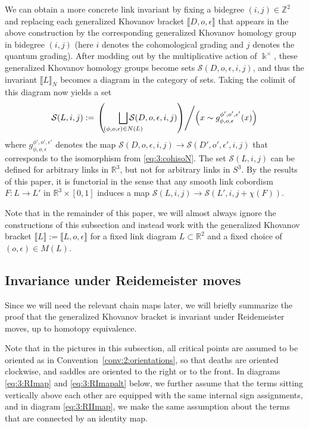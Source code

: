 \documentclass[12pt]{amsart}
\theoremstyle{definition}
\theoremstyle{plain}
\begin{document}
We can obtain a more concrete link invariant
by fixing a bidegree $(i,j)\in\mathbb{Z}^2$ and replacing 
each generalized Khovanov bracket $\llbracket D,o,\epsilon\rrbracket$ that appears in the above construction by 
the corresponding generalized Khovanov homology group in bidegree $(i,j)$ (here $i$ denotes the cohomological
grading and $j$ denotes the quantum grading).
After modding out by the multiplicative action of $\Bbbk^\times$, these generalized Khovanov homology groups
become sets $\mathcal{S}(D,o,\epsilon,i,j)$, 
and thus the invariant $\llbracket L\rrbracket_N$ becomes a diagram in the category of sets.
Taking the colimit of this diagram now yields a set
\[\mathcal{S}(L,i,j):=\left.\left(\quad\,\,\,\,\bigsqcup_{\mathclap{(\phi,o,\epsilon)\in N(L)}} \mathcal{S}(D,o,\epsilon,i,j)\right)\middle /
\left(x\sim g_{\phi,o,\epsilon}^{\phi',o',\epsilon'}(x)\right)\right.\]
where $g_{\phi,o,\epsilon}^{\phi',o',\epsilon'}$ denotes the map $\mathcal{S}(D,o,\epsilon,i,j)\rightarrow \mathcal{S}(D',o',\epsilon',i,j)$ that corresponds to the isomorphism from \eqref{eq:3:cohisoN}.
The set $\mathcal{S}(L,i,j)$ can be defined for arbitrary links in $\mathbb{R}^3$, but not for arbitrary links in $S^3$.
By the results of this paper, it is functorial in the sense that any smooth link cobordism $F\colon L\rightarrow L'$ in $\mathbb{R}^3\times[0,1]$ induces a map $\mathcal{S}(L,i,j)\rightarrow \mathcal{S}(L',i,j+\chi(F))$.

Note that in the remainder of this paper, we will almost always ignore the constructions of this subsection and instead work with the generalized Khovanov bracket $\llbracket L\rrbracket:=\llbracket L,o,\epsilon\rrbracket$
for a fixed link diagram $L\subset\mathbb{R}^2$ and a fixed choice of $(o,\epsilon)\in M(L)$.

\subsection{Invariance under Reidemeister moves}

Since we will need the relevant chain maps later, we will briefly summarize the proof that
the generalized Khovanov bracket is invariant under Reidemeister moves, up to homotopy equivalence.

Note that in the pictures in this subsection, all critical points are assumed to be oriented as in Convention~\ref{conv:2:orientations}, so that
deaths are oriented clockwise, and
 saddles are oriented to the right or to the front. In diagrams \eqref{eq:3:RImap} and \eqref{eq:3:RImapalt} below, we further assume
that the terms sitting vertically above each other are equipped with the same internal sign assignments, and
in diagram \eqref{eq:3:RIImap}, we make the same assumption about the terms that are connected by an identity map.
\end{document}
